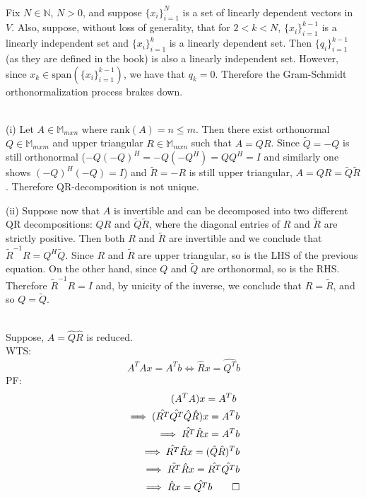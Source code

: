 \documentclass[letterpaper,12pt]{article}
\theoremstyle{definition}
\newenvironment{problem}[2][Problem]{\begin{trivlist}
\item[\hskip \labelsep {\bfseries #1}\hskip \labelsep {\bfseries #2.}]}{\end{trivlist}}
\begin{document}
\begin{problem}{11}~\\
Fix $N\in\mathbb N$, $N>0$, and suppose $\{x_i\}_{i=1}^N$ is a set of
linearly dependent vectors in $V$.
Also, suppose, without loss of generality, that for $2<k<N$,
$\{x_i\}_{i=1}^{k-1}$ is a linearly independent set and $\{x_i\}_{i=1}^k$ is a linearly dependent set.
Then $\{q_i\}_{i=1}^{k-1}$ (as they are defined in the book) is also a linearly independent set.
However, since $x_k\in\text{span}(\{x_i\}_{i=1}^{k-1})$, we have that $q_k=0$.
Therefore the Gram-Schmidt orthonormalization process brakes down.

\end{problem}
\begin{problem}{16}~\\
(i)
Let $A\in\mathbb M_{mxn}$ where $\text{rank}(A)=n\leq m$.
Then there exist orthonormal $Q\in\mathbb M_{mxm}$ and
upper triangular $R\in\mathbb M_{mxn}$ such that $A=QR$.
Since $\tilde{Q}=-Q$ is still orthonormal ($-Q(-Q)^H=-Q(-Q^H)=QQ^H=I$
and similarly one shows $(-Q)^H(-Q)=I$)
and $\tilde{R}=-R$ is still upper triangular,
$A=QR=\tilde{Q}\tilde{R}$.
Therefore QR-decomposition is not unique.

(ii)
Suppose now that $A$ is invertible and can be decomposed into
two different QR decompositions: $QR$ and $\tilde{Q}\tilde{R}$,
where the diagonal entries of $R$ and $\tilde{R}$ are strictly positive.
Then both $R$ and $\tilde{R}$ are invertible and we conclude that
$\tilde{R}^{-1}R=Q^H\tilde{Q}$.
Since $R$ and $\tilde{R}$ are upper triangular, so is the LHS of the previous equation.
On the other hand, since $Q$ and $\tilde{Q}$ are orthonormal, so is the RHS.
Therefore $\tilde{R}^{-1}R=I$ and, by unicity of the inverse, we conclude that $R=\tilde{R}$,
and so $Q=\tilde{Q}$.

\end{problem}

\begin{problem}{17}~\\
Suppose, $A = \hat{Q}\hat{R}$ is reduced. \\
WTS: $$ A^TAx = A^Tb \iff \hat{R}x = \hat{Q^T}b
$$
PF:
\begin{align*}
    (A^TA)x=A^Tb\ \\
    \implies (\hat{R^T}\hat{Q^T}\hat{Q}\hat{R})x =  A^Tb\\
    \implies \hat{R^T}\hat{R}x = A^Tb\\
    \implies \hat{R^T}\hat{R}x = (\hat{Q}\hat{R})^Tb\\
    \implies \hat{R^T}\hat{R}x = \hat{R^T}\hat{Q^T}b\\
    \implies \hat{R}x = \hat{Q^T}b \qed
\end{align*}
\end{problem}
\end{document}
